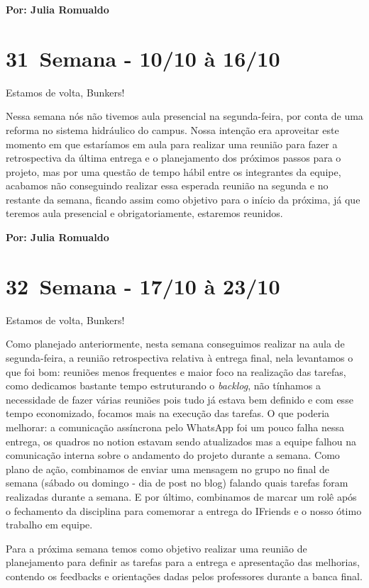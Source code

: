 \textbf{Por: Julia Romualdo}

\section{31\textordfeminine \, Semana - 10/10 à 16/10}
Estamos de volta, Bunkers!

Nessa semana nós não tivemos aula presencial na segunda-feira, por conta de uma reforma no sistema hidráulico do campus. Nossa intenção era aproveitar este momento em que estaríamos em aula para realizar uma reunião para fazer a retrospectiva da última entrega e o planejamento dos próximos passos para o projeto, mas por uma questão de tempo hábil entre os integrantes da equipe, acabamos não conseguindo realizar essa esperada reunião na segunda e no restante da semana, ficando assim como objetivo para o início da próxima, já que teremos aula presencial e obrigatoriamente, estaremos reunidos.

\textbf{Por: Julia Romualdo}

\section{32\textordfeminine \, Semana - 17/10 à 23/10}
Estamos de volta, Bunkers!

Como planejado anteriormente, nesta semana conseguimos realizar na aula de segunda-feira, a reunião retrospectiva relativa à entrega final, nela levantamos o que foi bom: reuniões menos frequentes e maior foco na realização das tarefas, como dedicamos bastante tempo estruturando o \textit{backlog}, não tínhamos a necessidade de fazer várias reuniões pois tudo já estava bem definido e com esse tempo economizado, focamos mais na execução das tarefas. O que poderia melhorar: a comunicação assíncrona pelo \gls{WhatsApp} foi um pouco falha nessa entrega, os quadros no \gls{notion} estavam sendo atualizados mas a equipe falhou na comunicação interna sobre o andamento do projeto durante a semana. Como plano de ação, combinamos de enviar uma mensagem no grupo no final de semana (sábado ou domingo - dia de post no blog) falando quais tarefas foram realizadas durante a semana. E por último, combinamos de marcar um rolê após o fechamento da disciplina para comemorar a entrega do IFriends e o nosso ótimo trabalho em equipe.
 
Para a próxima semana temos como objetivo realizar uma reunião de planejamento para definir as tarefas para a entrega e apresentação das melhorias, contendo os feedbacks e orientações dadas pelos professores durante a banca final.

